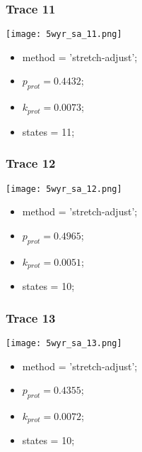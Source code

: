 \subsubsection{Trace 11}
\begin{minipage}[c]{0.7\textwidth}
    \texttt{[image: 5wyr\_sa\_11.png]}
\end{minipage}
\hfill
\begin{minipage}[c]{0.45\textwidth}
    \begin{itemize}
        \item method = 'stretch-adjust';
        \item $p_{prot}=0.4432$;
        \item $k_{prot}=0.0073$;
        \item states = 11;
    \end{itemize}
\end{minipage}

\subsubsection{Trace 12}
\begin{minipage}[c]{0.7\textwidth}
    \texttt{[image: 5wyr\_sa\_12.png]}
\end{minipage}
\hfill
\begin{minipage}[c]{0.45\textwidth}
    \begin{itemize}
        \item method = 'stretch-adjust';
        \item $p_{prot}=0.4965$;
        \item $k_{prot}=0.0051$;
        \item states = 10;
    \end{itemize}
\end{minipage}

\subsubsection{Trace 13}
\begin{minipage}[c]{0.7\textwidth}
    \texttt{[image: 5wyr\_sa\_13.png]}
\end{minipage}
\hfill
\begin{minipage}[c]{0.45\textwidth}
    \begin{itemize}
        \item method = 'stretch-adjust';
        \item $p_{prot}=0.4355$;
        \item $k_{prot}=0.0072$;
        \item states = 10;
    \end{itemize}
\end{minipage}

